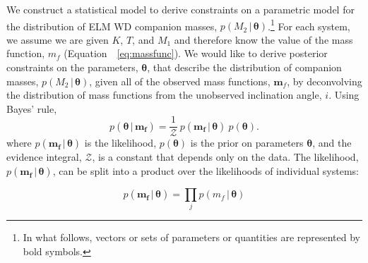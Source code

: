 \documentclass[apjl]{emulateapj}
\newcommand{\given}{\,|\,}
\newcommand{\bs}[1]{\boldsymbol{#1}}
\newcommand{\eqn}{Equation~}
\newcommand{\mf}{m_f}
\begin{document}
We construct a statistical model to derive constraints on a parametric model for the distribution of ELM WD companion masses, $p(M_2 \given \bs{\theta})$.\footnote{In what follows, vectors or sets of parameters or quantities are represented by bold symbols.} For each system, we assume we are given $K$, $T$, and $M_1$ and therefore know the value of the mass function, $\mf$ (\eqn~\ref{eq:massfunc}). We would like to derive posterior constraints on the parameters, $\bs{\theta}$, that describe the distribution of companion masses, $p(M_2\given \bs{\theta})$, given all of the observed mass functions, $\bs{m}_f$, by deconvolving the distribution of mass functions from the unobserved inclination angle, $i$. Using Bayes' rule,
\begin{equation}
    p(\bs{\theta} \given \bs{\mf}) = \frac{1}{\mathcal{Z}}~p(\bs{\mf} \given \bs{\theta})~p(\bs{\theta}).
\end{equation}
where $p(\bs{\mf} \given \bs{\theta})$ is the likelihood, $p(\bs{\theta})$ is the prior on parameters $\bs{\theta}$, and the evidence integral, $\mathcal{Z}$, is a constant that depends only on the data. The likelihood, $p(\bs{\mf} \given \bs{\theta})$, can be split into a product over the likelihoods of individual systems:

\begin{equation}
p(\bs{\mf} \given \bs{\theta}) = \prod_j p(\mf \given \bs{\theta})
\end{equation}
\end{document}
